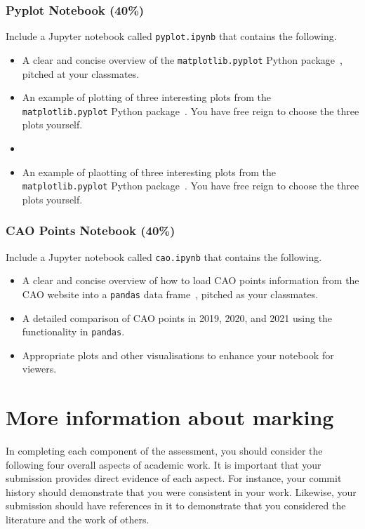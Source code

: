 \documentclass[a4paper, 12pt]{scrartcl}
\begin{document}
  \subsubsection*{Pyplot Notebook (40\%)}
  Include a Jupyter notebook called \texttt{pyplot.ipynb} that contains the following.
  \begin{itemize}
    \item A clear and concise overview of the \texttt{matplotlib.pyplot} Python package~\cite{pyplot}, pitched at your classmates.
    \item An example of plotting  of three interesting plots from the \texttt{matplotlib.pyplot} Python package~\cite{pyplot}. You have free reign to choose the three plots yourself.
    \item \item An example of plaotting  of three interesting plots from the \texttt{matplotlib.pyplot} Python package~\cite{pyplot}. You have free reign to choose the three plots yourself.
  \end{itemize}

  \subsubsection*{CAO Points Notebook (40\%)}
  Include a Jupyter notebook called \texttt{cao.ipynb} that contains the following.
  \begin{itemize}
    \item A clear and concise overview of how to load CAO points information from the CAO website into a \texttt{pandas} data frame~\cite{pandas}, pitched as your classmates.
    \item A detailed comparison of CAO points in 2019, 2020, and 2021 using the functionality in \texttt{pandas}.
    \item Appropriate plots and other visualisations to enhance your notebook for viewers.
  \end{itemize}

  \section*{More information about marking}
    In completing each component of the assessment, you should consider the following four overall aspects of academic work.
    It is important that your submission provides direct evidence of each aspect.
    For instance, your commit history should demonstrate that you were consistent in your work.
    Likewise, your submission should have references in it to demonstrate that you considered the literature and the work of others.
  
\end{document}
